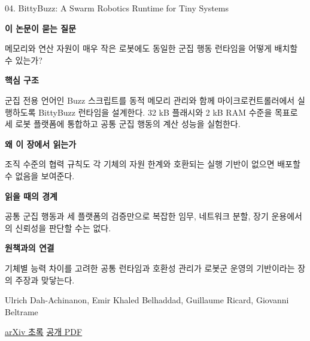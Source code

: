 \documentclass[11pt,openany]{book}
\begin{document}
\begin{termcard}{04. BittyBuzz: A Swarm Robotics Runtime for Tiny Systems}

\par

\medskip

{\sffamily\bfseries\color{deepblue} 이 논문이 묻는 질문}\par

메모리와 연산 자원이 매우 작은 로봇에도 동일한 군집 행동 런타임을 어떻게 배치할 수 있는가?

\smallskip

{\sffamily\bfseries\color{deepblue} 핵심 구조}\par

군집 전용 언어인 Buzz 스크립트를 동적 메모리 관리와 함께 마이크로컨트롤러에서 실행하도록 BittyBuzz 런타임을 설계한다. 32 kB 플래시와 2 kB RAM 수준을 목표로 세 로봇 플랫폼에 통합하고 공통 군집 행동의 계산 성능을 실험한다.

\smallskip

{\sffamily\bfseries\color{deepblue} 왜 이 장에서 읽는가}\par

조직 수준의 협력 규칙도 각 기체의 자원 한계와 호환되는 실행 기반이 없으면 배포할 수 없음을 보여준다.

\smallskip

{\sffamily\bfseries\color{coral} 읽을 때의 경계}\par

공통 군집 행동과 세 플랫폼의 검증만으로 복잡한 임무, 네트워크 분할, 장기 운용에서의 신뢰성을 판단할 수는 없다.

\smallskip

{\sffamily\bfseries\color{teal} 원책과의 연결}\par

기체별 능력 차이를 고려한 공통 런타임과 호환성 관리가 로봇군 운영의 기반이라는 장의 주장과 맞닿는다.

\medskip

{\footnotesize\color{muted} Ulrich Dah-Achinanon, Emir Khaled Belhaddad, Guillaume Ricard, Giovanni Beltrame\par

\href{https://arxiv.org/abs/2307.06912}{arXiv 초록} \quad \href{https://arxiv.org/pdf/2307.06912}{공개 PDF}\par}

\end{termcard}
\end{document}
